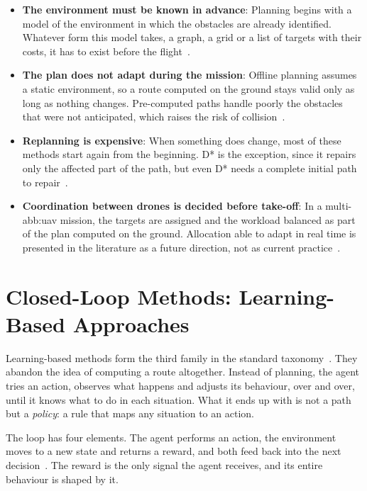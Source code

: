 \begin{itemize}[itemsep=0.5em]
    \item \textbf{The environment must be known in advance}: Planning begins with
          a model of the environment in which the obstacles are already
          identified. Whatever form this model takes, a graph, a grid or a list
          of targets with their costs, it has to exist before the
          flight~\cite{kumar2025comprehensive}.
    \item \textbf{The plan does not adapt during the mission}: Offline planning
          assumes a static environment, so a route computed on the ground stays
          valid only as long as nothing changes. Pre-computed paths handle poorly
          the obstacles that were not anticipated, which raises the risk of
          collision~\cite{pore2026uavqr}.
    \item \textbf{Replanning is expensive}: When something does change, most of
          these methods start again from the beginning. D* is the exception,
          since it repairs only the affected part of the path, but even D* needs
          a complete initial path to repair~\cite{krayani2023goal}.
    \item \textbf{Coordination between drones is decided before take-off}: In a
          multi-\gls{abb:uav} mission, the targets are assigned and the workload
          balanced as part of the plan computed on the ground. Allocation able to
          adapt in real time is presented in the literature as a future
          direction, not as current practice~\cite{kumar2025comprehensive}.
\end{itemize}
\section{Closed-Loop Methods: Learning-Based Approaches}%
\label{sec:nav:learning}

Learning-based methods form the third family in the standard
taxonomy~\cite{krayani2023goal}. They abandon the idea of computing a route
altogether. Instead of planning, the agent tries an action, observes what happens
and adjusts its behaviour, over and over, until it knows what to do in each
situation. What it ends up with is not a path but a \emph{policy}: a rule that
maps any situation to an action.

The loop has four elements. The agent performs an action, the environment moves
to a new state and returns a reward, and both feed back into the next
decision~\cite{chang2023review}. The reward is the only signal the agent
receives, and its entire behaviour is shaped by it.


